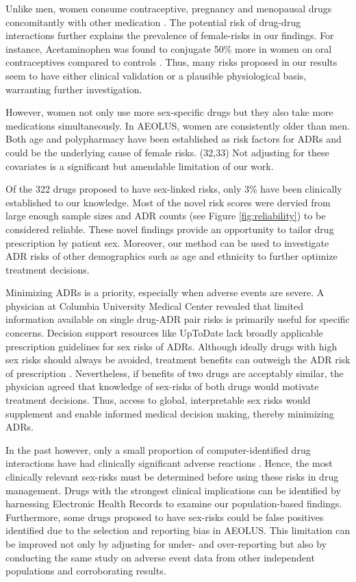 \documentclass[11pt, oneside]{article}
\begin{document}
Unlike men, women consume contraceptive, pregnancy and menopausal drugs concomitantly with other medication \cite{borda_studies_1967}. The potential risk of drug-drug interactions further explains the prevalence of female-risks in our findings. For instance, Acetaminophen was found to conjugate 50\% more in women on oral contraceptives compared to controls \cite{rademaker_women_2001}. Thus, many risks proposed in our results seem to have either clinical validation or a plausible physiological basis, warranting further investigation. 

However, women not only use more sex-specific drugs but they also take more medications simultaneously. In AEOLUS, women are consistently older than men. Both age and polypharmacy have been established as risk factors for ADRs and could be the underlying cause of female risks. {(32,33)}\cite{rademaker_women_2001} Not adjusting for these covariates is a significant but amendable limitation of our work. 

Of the 322 drugs proposed to have sex-linked risks, only 3\% have been clinically established to our knowledge. Most of the novel risk scores were dervied from large enough sample sizes and ADR counts (see Figure \ref{fig:reliability}) to be considered reliable. These novel findings provide an opportunity to tailor drug prescription by patient sex. Moreover, our method can be used to investigate ADR risks of other demographics such as age and ethnicity to further optimize treatment decisions.

Minimizing ADRs is a priority, especially when adverse events are severe. A physician at Columbia University Medical Center revealed that limited information available on single drug-ADR pair risks is primarily useful for specific concerns. Decision support resources like UpToDate lack broadly applicable prescription guidelines for sex risks of ADRs. Although ideally drugs with high sex risks should always be avoided, treatment benefits can outweigh the ADR risk of prescription \cite{paepe_drug_2013}. Nevertheless, if benefits of two drugs are acceptably similar, the physician agreed that knowledge of sex-risks of both drugs would motivate treatment decisions. Thus, access to global, interpretable sex risks would supplement and enable informed medical decision making, thereby minimizing ADRs.

In the past however, only a small proportion of computer-identified drug interactions have had clinically significant adverse reactions \cite{paepe_drug_2013}. Hence, the most clinically relevant sex-risks must be determined before using these risks in drug management. Drugs with the strongest clinical implications can be identified by harnessing Electronic Health Records to examine our population-based findings. Furthermore, some drugs proposed to have sex-risks could be false positives identified due to the selection and reporting bias in AEOLUS. \cite{banda_curated_2016} This limitation can be improved not only by adjusting for under- and over-reporting but also by conducting the same study on adverse event data from other independent populations and corroborating results. 
\end{document}
